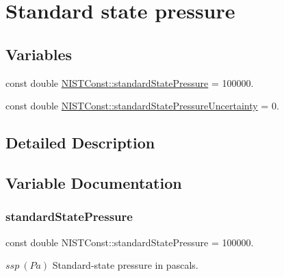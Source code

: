 \hypertarget{group___n_i_s_t_const-_standard_state_pressure}{}\section{Standard state pressure}
\label{group___n_i_s_t_const-_standard_state_pressure}
\subsection*{Variables}
\begin{DoxyCompactItemize}
\item 
const double \hyperlink{group___n_i_s_t_const-_standard_state_pressure_gaede4b63db291cd6a839180595c7a191d}{N\+I\+S\+T\+Const\+::standard\+State\+Pressure} = 100000.
\item 
const double \hyperlink{group___n_i_s_t_const-_standard_state_pressure_gad09c32ae21271794dece1e639699e96a}{N\+I\+S\+T\+Const\+::standard\+State\+Pressure\+Uncertainty} = 0.
\end{DoxyCompactItemize}


\subsection{Detailed Description}


\subsection{Variable Documentation}
\mbox{\label{group___n_i_s_t_const-_standard_state_pressure_gaede4b63db291cd6a839180595c7a191d}} 
\subsubsection{\texorpdfstring{standard\+State\+Pressure}{standardStatePressure}}
{\footnotesize\ttfamily const double N\+I\+S\+T\+Const\+::standard\+State\+Pressure = 100000.}

$ssp \ (Pa)$ Standard-\/state pressure in pascals. \mbox{\label{group___n_i_s_t_const-_standard_state_pressure_gad09c32ae21271794dece1e639699e96a}} 
